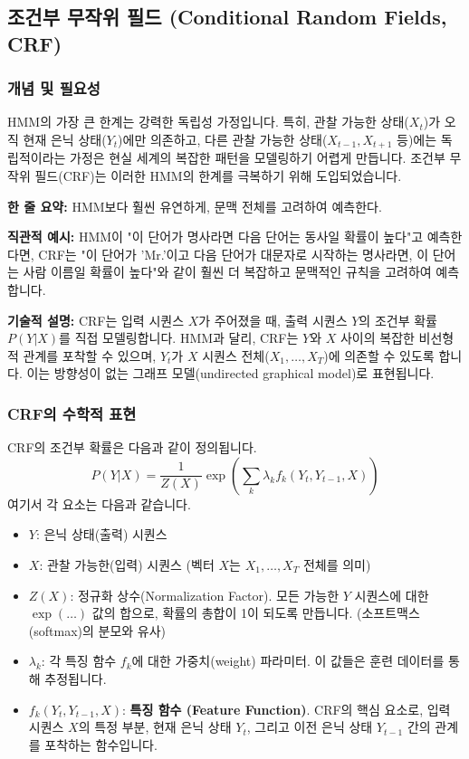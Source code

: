 \documentclass[11pt,a4paper]{article}
\begin{document}
\subsection{조건부 무작위 필드 (Conditional Random Fields, CRF)}

\subsubsection{개념 및 필요성}
HMM의 가장 큰 한계는 강력한 독립성 가정입니다. 특히, 관찰 가능한 상태($X_t$)가 오직 현재 은닉 상태($Y_t$)에만 의존하고, 다른 관찰 가능한 상태($X_{t-1}, X_{t+1}$ 등)에는 독립적이라는 가정은 현실 세계의 복잡한 패턴을 모델링하기 어렵게 만듭니다. 조건부 무작위 필드(CRF)는 이러한 HMM의 한계를 극복하기 위해 도입되었습니다.

\begin{tcolorbox}[conceptbox, title=조건부 무작위 필드 (CRF)의 핵심 아이디어]
\textbf{한 줄 요약:} HMM보다 훨씬 유연하게, 문맥 전체를 고려하여 예측한다.

\textbf{직관적 예시:} HMM이 "이 단어가 명사라면 다음 단어는 동사일 확률이 높다"고 예측한다면, CRF는 "이 단어가 'Mr.'이고 다음 단어가 대문자로 시작하는 명사라면, 이 단어는 사람 이름일 확률이 높다"와 같이 훨씬 더 복잡하고 문맥적인 규칙을 고려하여 예측합니다.

\textbf{기술적 설명:} CRF는 입력 시퀀스 $X$가 주어졌을 때, 출력 시퀀스 $Y$의 조건부 확률 $P(Y|X)$를 직접 모델링합니다. HMM과 달리, CRF는 $Y$와 $X$ 사이의 복잡한 비선형적 관계를 포착할 수 있으며, $Y_t$가 $X$ 시퀀스 전체($X_1, \dots, X_T$)에 의존할 수 있도록 합니다. 이는 방향성이 없는 그래프 모델(undirected graphical model)로 표현됩니다.
\end{tcolorbox}

\subsubsection{CRF의 수학적 표현}
CRF의 조건부 확률은 다음과 같이 정의됩니다.
\[ P(Y|X) = \frac{1}{Z(X)} \exp\left(\sum_k \lambda_k f_k(Y_t, Y_{t-1}, X)\right) \]
여기서 각 요소는 다음과 같습니다.
\begin{itemize}
    \item $Y$: 은닉 상태(출력) 시퀀스
    \item $X$: 관찰 가능한(입력) 시퀀스 (벡터 $X$는 $X_1, \dots, X_T$ 전체를 의미)
    \item $Z(X)$: 정규화 상수(Normalization Factor). 모든 가능한 $Y$ 시퀀스에 대한 $\exp(\dots)$ 값의 합으로, 확률의 총합이 1이 되도록 만듭니다. (소프트맥스(softmax)의 분모와 유사)
    \item $\lambda_k$: 각 특징 함수 $f_k$에 대한 가중치(weight) 파라미터. 이 값들은 훈련 데이터를 통해 추정됩니다.
    \item $f_k(Y_t, Y_{t-1}, X)$: \textbf{특징 함수 (Feature Function)}. CRF의 핵심 요소로, 입력 시퀀스 $X$의 특정 부분, 현재 은닉 상태 $Y_t$, 그리고 이전 은닉 상태 $Y_{t-1}$ 간의 관계를 포착하는 함수입니다.
\end{itemize}
\end{document}
